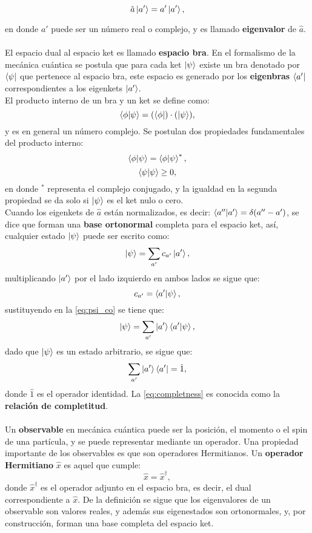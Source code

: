 \[ \hat{a}\ket{a'} = a'\ket{a'},\]

\noindent en donde $a'$ puede ser un número real o complejo, y es llamado \textbf{eigenvalor} de $\hat{a}$.
\\
\\
El espacio dual al espacio ket es llamado \textbf{espacio bra}. En el formalismo de la mecánica cuántica se postula que para cada ket $\ket{\psi}$ existe un bra denotado por $\bra{\psi}$ que pertenece al espacio bra, este espacio es generado por los \textbf{eigenbras} $\bra{a'}$ correspondientes a los eigenkets $\ket{a'}$.
\\
El producto interno de un bra y un ket se define como:
\[ \bra{\phi}\ket{\psi} = (\bra{\phi})\cdot (\ket{\psi}), \]
y es en general un número complejo. Se postulan dos propiedades fundamentales del producto interno:
\[ \bra{\phi}\ket{\psi} = \bra{\phi}\ket{\psi}^* ,\]
\[ \bra{\psi}\ket{\psi} \geq 0, \]
en donde $^*$ representa el complejo conjugado, y la igualdad en la segunda propiedad se da solo si $\ket{\psi}$ es el ket nulo o cero.
\\
Cuando los eigenkets de $\hat{a}$ están normalizados, es decir: $\bra{a''}\ket{a'}=\delta(a''-a')$, se dice que forman una \textbf{base ortonormal} completa para el espacio ket, así, cualquier estado $\ket{\psi}$ puede ser escrito como:
\begin{equation}
 \ket{\psi} = \sum_{a'}c_{a'}\ket{a'},\label{eq:psi_co}
\end{equation}
multiplicando $\ket{a'}$ por el lado izquierdo en ambos lados se sigue que:
\[ c_{a'} = \bra{a'}\ket{\psi}, \]
sustituyendo en la \autoref{eq:psi_co} se tiene que:
\begin{equation}
  \ket{\psi} = \sum_{a'}\ket{a'}\bra{a'}\ket{\psi},
\end{equation}
dado que $\ket{\psi}$ es un estado arbitrario, se sigue que:
\begin{equation}
  \label{eq:completness}
  \sum_{a'}\ket{a'}\bra{a'} = \hat{1},
\end{equation}
donde $\hat{1}$ es el operador identidad. La \autoref{eq:completness} es conocida como la \textbf{relación de completitud}.
\\
\\
Un \textbf{observable} en mecánica cuántica puede ser la posición, el momento o el spin de una partícula, y se puede representar mediante un operador. Una propiedad importante de los observables es que son operadores Hermitianos. Un \textbf{operador Hermitiano} $\hat{x}$ es aquel que cumple:
\[ \hat{x} = \hat{x}^\dag,\]
donde $\hat{x}^\dag$ es el operador adjunto en el espacio bra, es decir, el dual correspondiente a $\hat{x}$. De la definición se sigue que los eigenvalores de un observable son valores reales, y además sus eigenestados son ortonormales, y, por construcción, forman una base completa del espacio ket.

